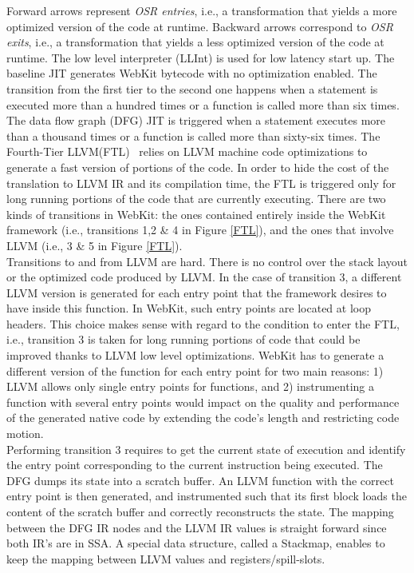 Forward arrows represent \textit{OSR entries}, i.e., a transformation that yields a more optimized version of the code at runtime.
Backward arrows correspond to \textit{OSR exits}, i.e., a transformation that yields a less optimized version of the code at runtime.
The low level interpreter (LLInt) is used for low latency start up.
The baseline JIT generates WebKit bytecode with no optimization enabled.
The transition from the first tier to the second one happens when a statement is executed more than a hundred times or a function is called more than six times.
The data flow graph (DFG) JIT is triggered when a statement executes more than a thousand times or a function is called more than sixty-six times.
The Fourth-Tier LLVM(FTL)~\cite{WebKitFTL} relies on LLVM machine code optimizations to generate a fast version of portions of the code.
In order to hide the cost of the translation to LLVM IR and its compilation time, the FTL is triggered only for long running portions of the code that are currently executing.
There are two kinds of transitions in WebKit: the ones contained entirely inside the WebKit framework (i.e., transitions 1,2 \& 4 in Figure \ref{FTL}), and the ones that involve LLVM (i.e., 3 \& 5 in Figure \ref{FTL}).\\

Transitions to and from LLVM are hard. 
There is no control over the stack layout or the optimized code produced by LLVM.
In the case of transition 3, a different LLVM version is generated for each entry point that the framework desires to have inside this function.
In WebKit, such entry points are located at loop headers. 
This choice makes sense with regard to the condition to enter the FTL, i.e., transition 3 is taken for long running portions of code that could be improved thanks to LLVM low level optimizations.
WebKit has to generate a different version of the function for each entry point for two main reasons: 1) LLVM allows only single entry points for functions, and 2) instrumenting a function with several entry points would impact on the quality and performance of the generated native code by extending the code's length and restricting code motion.\\

Performing transition 3 requires to get the current state of execution and identify the entry point corresponding to the current instruction being executed.
The DFG dumps its state into a scratch buffer.
An LLVM function with the correct entry point is then generated, and instrumented such that its first block loads the content of the scratch buffer and correctly reconstructs the state.
The mapping between the DFG IR nodes and the LLVM IR values is straight forward since both IR's are in SSA.
A special data structure, called a Stackmap, enables to keep the mapping between LLVM values and registers/spill-slots.\\

